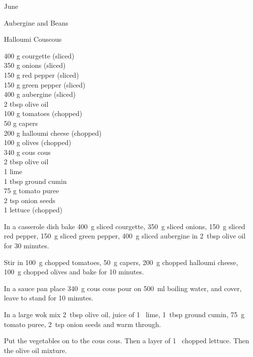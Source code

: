 \begin{menu}{June}
\begin{recipe}{2}{Aubergine and Beans}
\begin{instructions}
    \end{instructions}
    \end{recipe}%
  
    \begin{recipe}{2}{Halloumi Couscous}%
		\begin{ingredients}
		400 g courgette (sliced) \\
	350 g onions (sliced) \\
	150 g red pepper (sliced) \\
	150 g green pepper (sliced) \\
	400 g aubergine (sliced) \\
	2 tbsp olive oil  \\
	100 g tomatoes (chopped) \\
	50 g capers  \\
	200 g halloumi cheese (chopped) \\
	100 g olives (chopped) \\
	340 g cous cous  \\
	2 tbsp olive oil  \\
	1  lime  \\
	1 tbsp ground cumin  \\
	75 g tomato puree  \\
	2 tsp onion seeds  \\
	1  lettuce (chopped) \\
	
		\end{ingredients}
	
	
    \begin{instructions}
    \item 
        In a casserole dish bake
        400~g sliced courgette,
        350~g sliced onions,
        150~g sliced red pepper,
        150~g sliced green pepper,
        400~g sliced aubergine
        in
        2~tbsp  olive oil
        for 30 minutes.
      \item 
        Stir in
        100~g chopped tomatoes,
        50~g  capers,
        200~g chopped halloumi cheese,
        100~g chopped olives
        and bake for 10 minutes.
      \item 
    In a
    sauce pan 
    place
    340~g  cous cous
    pour on
    500~ml  boiling water,
    and cover, leave to stand for 10 minutes.
  \item 
        In a large wok mix
        2~tbsp  olive oil,
        juice of
        1~  lime,
        1~tbsp  ground cumin,
        75~g  tomato puree,
        2~tsp  onion seeds
        and warm through.
      \item 
        Put the vegetables on to the cous cous.
        Then a layer of
        1~ chopped lettuce.
        Then the olive oil mixture.
      

\end{instructions}
\end{recipe}
\end{menu}
